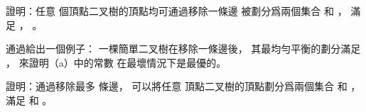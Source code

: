 \startigBase[a]\startitem
證明：任意  個頂點二叉樹的頂點均可通過移除一條邊
被劃分爲兩個集合  和 ，
滿足 ， 。
\stopitem\stopigBase

\startANSWER
{}
\stopANSWER

\startigBase[continue]\startitem
通過給出一個例子：
一棵簡單二叉樹在移除一條邊後，
其最均勻平衡的劃分滿足 ，
來證明（a）中的常數  在最壞情況下是最優的。
\stopitem\stopigBase

\startANSWER
{}
\stopANSWER

\startigBase[continue]\startitem
證明：通過移除最多  條邊，
可以將任意  頂點二叉樹的頂點劃分爲兩個集合  和 ，
滿足  和 。
\stopitem\stopigBase

\startANSWER
{}
\stopANSWER
\stopPROBLEM

\stopsubject%
